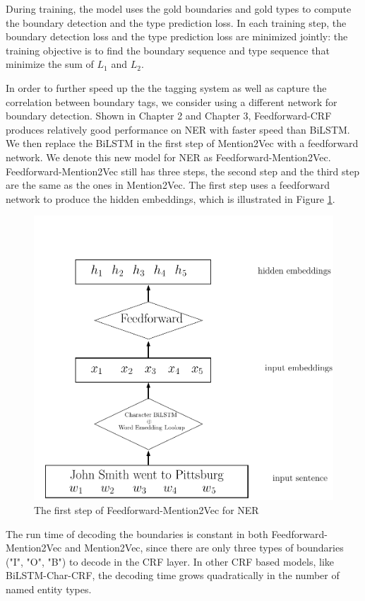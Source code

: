 During training, the model uses the gold boundaries and gold types to compute the boundary detection and the type prediction loss. In each training step, the boundary detection loss and the type prediction loss are minimized jointly: the training objective is to find the boundary sequence and type sequence that minimize the sum of $L_{1}$ and $L_{2}$.


In order to further speed up the the tagging system as well as capture the correlation between boundary tags, we consider using a different network for boundary detection. Shown in Chapter 2 and Chapter 3, Feedforward-CRF produces relatively good performance on NER with faster speed than BiLSTM. We then replace the BiLSTM in the first step of Mention2Vec with a feedforward network. We denote this new model for NER as Feedforward-Mention2Vec. Feedforward-Mention2Vec still has three steps, the second step and the third step are the same as the ones in Mention2Vec. The first step uses a feedforward network to produce the hidden embeddings, which is illustrated in Figure \ref{fig:mention2vec4}.

\begin{figure}
  \centering
  \includegraphics[scale=0.6]{mention2vec4.pdf}
 \caption{The first step of Feedforward-Mention2Vec for NER}
  \label{fig:mention2vec4}
\end{figure}

The run time of decoding the boundaries is constant in both Feedforward-Mention2Vec and Mention2Vec, since there are only three types of boundaries ("I", "O", "B") to decode in the CRF layer. In other CRF based models, like BiLSTM-Char-CRF, the decoding time grows quadratically in the number of named entity types. 

